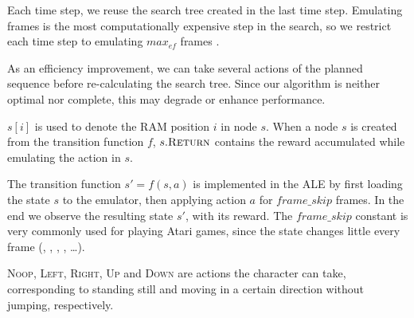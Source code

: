 Each time step, we reuse the search tree created in the last time step.
Emulating frames is the most computationally expensive step in the search, so we
restrict each time step to emulating $max_{ef}$ frames
\citep{lipovetzky2015classical}.

As an efficiency improvement, we can take several actions of the planned
sequence before re-calculating the search tree. Since our algorithm is neither
optimal nor complete, this may degrade or enhance performance.

$s[i]$ is used to denote the \ac{RAM} position $i$ in node $s$. When a node $s$ is
created from the transition function $f$, $s.\textsc{Return}$ contains the
reward accumulated while emulating the action in $s$.

The transition function $s' = f(s, a)$ is implemented in the \ac{ALE} by first
loading the state $s$ to the emulator, then applying action $a$ for $frame\_skip$
frames. In the end we observe the resulting state $s'$, with its reward. The
$frame\_skip$ constant is very commonly used for playing Atari games, since the
state changes little every frame (\cite{bellemare2013arcade},
\cite{lipovetzky2015classical}, \cite{mnih2015human},
\cite{kulkarni2016hierarchical}, \dots).

\textsc{Noop}, \textsc{Left}, \textsc{Right}, \textsc{Up} and \textsc{Down} are
actions the character can take, corresponding to standing still and moving
in a certain direction without jumping, respectively.

